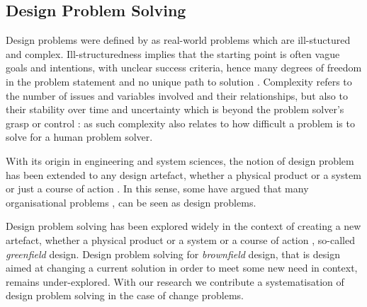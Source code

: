 \documentclass[runningheads,a4paper]{llncs}
\begin{document}
\subsection{Design Problem Solving}\label{design}

Design problems were defined by \cite{jonassen2000toward} as real-world problems which are ill-stuctured and complex. Ill-structuredness implies that the starting point is often vague goals and intentions, with unclear success criteria, hence many degrees of freedom in the problem statement and no unique path to solution \cite{simon1977structure}%
. Complexity refers to the number of issues and variables involved and their relationships, but also to their stability over time and uncertainty which is beyond the problem solver's grasp or control \cite{funke1991solving}%
: as such complexity also relates to how difficult a problem is to solve for a human problem solver.

With its origin in engineering and system sciences, the notion of design problem has been extended to any design artefact, whether a physical product or a system or just a course of action \cite{smith1993conceptual}. In this sense, some have argued that many organisational problems \cite{martin2009design},\cite{leavy2010design} can be seen as design problems. 

Design problem solving \cite{smith1993conceptual}  has been explored widely in the context of creating a new artefact, whether a physical product or a system or a course of action \cite{smith1993conceptual}, so-called {\it greenfield} design. Design problem solving for {\it brownfield} design, that is design aimed at changing a current solution in order to meet some new need in context, remains under-explored. With our research we contribute a systematisation of design problem solving in the case of change problems. 
\end{document}
